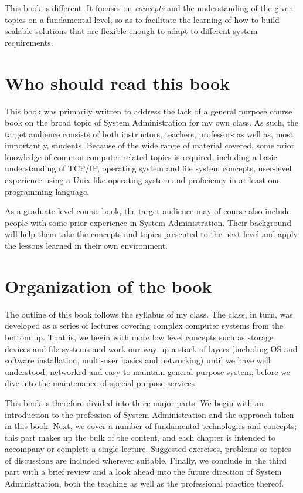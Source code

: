 This book is different.  It focuses on {\em concepts}
and the understanding of the given topics on a
fundamental level, so as to facilitate the learning of
how to build scalable solutions that are flexible
enough to adapt to different system requirements.

\section*{Who should read this book}

This book was primarily written to address the lack of
a general purpose course book on the broad topic of
System Administration for my own class.  As such, the
target audience consists of both instructors,
teachers, professors as well as, most importantly,
students.  Because of the wide range of material
covered, some prior knowledge of common
computer-related topics is required, including a basic
understanding of TCP/IP, operating system and file
system concepts, user-level experience using a Unix
like operating system and proficiency in at least one
programming language.

As a graduate level course book, the target audience
may of course also include people with some prior
experience in System Administration.  Their background
will help them take the concepts and topics presented
to the next level and apply the lessons learned in
their own environment.

\section*{Organization of the book}

The outline of this book follows the syllabus of my
class.  The class, in turn, was developed as a series
of lectures covering complex computer systems from the
bottom up.  That is, we begin with more low level
concepts such as storage devices and file systems and
work our way up a stack of layers (including OS and
software installation, multi-user basics and
networking) until we have well understood, networked
and easy to maintain general purpose system, before we
dive into the maintenance of special purpose services.

This book is therefore divided into three major parts.
We begin with an introduction to the profession of
System Administration and the approach taken in this
book.  Next, we cover a number of fundamental
technologies and concepts; this part makes up the bulk
of the content, and each chapter is intended to
accompany or complete a single lecture.  Suggested
exercises, problems or topics of discussions are
included wherever suitable. Finally, we conclude in
the third part with a brief review and a look ahead
into the future direction of System Administration,
both the teaching as well as the professional practice
thereof.

